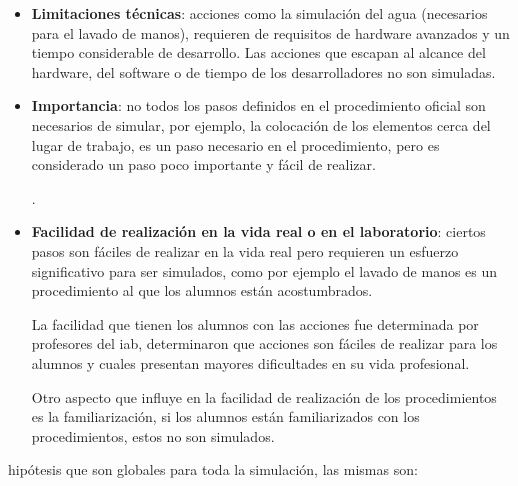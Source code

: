 \begin{itemize}

    \item \textbf{Limitaciones técnicas}: acciones como la simulación del agua
        (necesarios para el lavado de manos), requieren de requisitos de
        hardware avanzados y un tiempo considerable de desarrollo. Las acciones
        que escapan al alcance del hardware, del software o de tiempo de los
        desarrolladores no son simuladas.

    \item \textbf{Importancia}: no todos los pasos definidos en el procedimiento
        oficial son necesarios de simular, por ejemplo, la colocación de los
        elementos cerca del lugar de trabajo, es un paso necesario en el
        procedimiento, pero es considerado un paso poco importante y fácil de
        realizar.

        .

    \item \textbf{Facilidad de realización en la vida real o en el laboratorio}:
        ciertos pasos son fáciles de realizar en la vida real pero requieren un
        esfuerzo significativo para ser simulados, como por ejemplo el lavado de
        manos es un procedimiento al que los alumnos están acostumbrados.

        La facilidad que tienen los alumnos con las acciones fue determinada por
        profesores del \Gls{iab}, determinaron que acciones son fáciles de
        realizar para los alumnos y cuales presentan mayores dificultades en su
        vida profesional.

        Otro aspecto que influye en la facilidad de realización de los
        procedimientos es la familiarización, si los alumnos están
        familiarizados con los procedimientos, estos no son simulados.

\end{itemize}
 hipótesis que son globales para toda la simulación, las mismas son:


